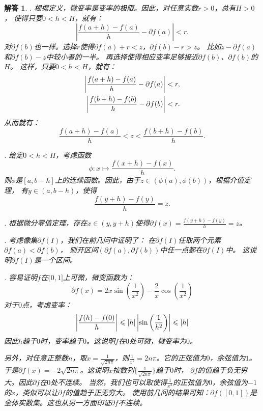 \documentclass[12pt,UTF8]{ctexbook}
\newtheorem*{so}{解答}
\begin{document}
\begin{so}
    . 根据定义，微变率是变率的极限。因此，对任意实数$r>0$，总有$H>0$，
    使得只要$0 < h < H$，就有：
    $$\left| \frac{f(a + h) - f(a)}{h} - \partial f(a) \right| < r.$$
    对$\partial f (b)$也一样。选择$r$使得$\partial f(a) + r < z$，$\partial f(b) - r > z$。
    比如$z - \partial f(a)$和$\partial f(b) - z$中较小者的一半。
    再选择使得相应变率足够接近$\partial f (b)$、$\partial f (b)$的$H$。
    这样，只要$0 < h < H$，就有：
    \begin{align}
        \left| \frac{f(a + h) - f(a)}{h} - \partial f(a) \right| < r, \notag \\
        \left| \frac{f(b + h) - f(b)}{h} - \partial f(b) \right| < r. \notag
    \end{align}
    从而就有：
    $$ \frac{f(a + h) - f(a)}{h} < z < \frac{f(b + h) - f(b)}{h}. $$
    
    . 给定$0 < h < H$，考虑函数
    $$\phi : x\mapsto \frac{f(x + h) - f(x)}{h}. $$
    则$\phi$是$[a, b-h]$上的连续函数。因此，由于$z\in (\phi(a), \phi(b))$，根据介值定理，
    有$y\in (a, b-h)$，使得
    $$ \frac{f(y + h) - f(y)}{h} = z.$$

    . 根据微分零值定理，存在$x\in (y, y+h)$使得$\partial f(x) = \frac{f(y + h) - f(y)}{h} = z$。

    . 考虑像集$\partial f(I)$，我们在前几问中证明了：
    在$\partial f(I)$任取两个元素$\partial f(a) < \partial f(b)$，
    则开区间$(\partial f(a), \partial f(b))$中任一点都在$\partial f(I)$中。
    这说明$\partial f(I)$是一个区间。

    . 容易证明$f$在$(0, 1]$上可微，微变函数为：
    $$ \partial f(x) = 2x\sin{\left(\frac{1}{x^2}\right)} - \frac{2}{x} \cos{\left(\frac{1}{x^2}\right)}$$
    对于$0$点，考虑变率：
    \begin{align}
        \left| \frac{f(h) - f(0)}{h} \right| \leqslant |h|\left|\sin{\left(\frac{1}{h^2}\right)}\right| \leqslant |h| \notag
    \end{align}
    因此$h$趋于$0$时，变率趋于$0$。这说明$f$在$0$处可微，微变率为$0$。

    另外，对任意正整数$n$，取$x = \frac{1}{\sqrt{2n \pi}}$，则$\frac{1}{x^2} = 2n \pi$。它的正弦值为$0$，余弦值为$1$。
    于是$\partial f(x) = -2\sqrt{2n\pi}$。这说明$x$按数列$\{\frac{1}{\sqrt{2n \pi}}\}$趋于$0$时，
    $\partial f$的值趋于负无穷大。因此$\partial f$在$0$处不连续。
    当然，我们也可以取使得$\frac{1}{x^2}$的正弦值为$0$，余弦值为$-1$的$x$，类似可以让$\partial f$的值趋于正无穷大。
    使用前几问的结果可知：$\partial f([0,1])$是全体实数集。这也从另一方面印证$\partial f$不连续。
\end{so}
\end{document}
